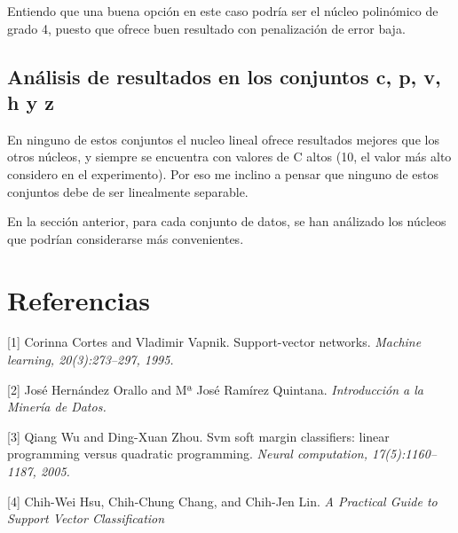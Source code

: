 \documentclass[11pt]{article}
\begin{document}
Entiendo que una buena opción en este caso podría ser el núcleo
polinómico de grado 4, puesto que ofrece buen resultado con penalización
de error baja.

\subsection{Análisis de resultados en los conjuntos c, p, v, h y
z}\label{anuxe1lisis-de-resultados-en-los-conjuntos-c-p-v-h-y-z}

En ninguno de estos conjuntos el nucleo lineal ofrece resultados mejores
que los otros núcleos, y siempre se encuentra con valores de C altos
(10, el valor más alto considero en el experimento). Por eso me inclino
a pensar que ninguno de estos conjuntos debe de ser linealmente
separable.

En la sección anterior, para cada conjunto de datos, se han análizado
los núcleos que podrían considerarse más convenientes.

    \section{Referencias}\label{referencias}

{[}1{]} Corinna Cortes and Vladimir Vapnik. Support-vector networks.
\emph{Machine learning, 20(3):273--297, 1995.}

{[}2{]} José Hernández Orallo and Mª José Ramírez Quintana.
\emph{Introducción a la Minería de Datos.}

{[}3{]} Qiang Wu and Ding-Xuan Zhou. Svm soft margin classifiers: linear
programming versus quadratic programming. \emph{Neural computation,
17(5):1160--1187, 2005.}

{[}4{]} Chih-Wei Hsu, Chih-Chung Chang, and Chih-Jen Lin. \emph{A
Practical Guide to Support Vector Classification}


    
    
    
    
\end{document}
